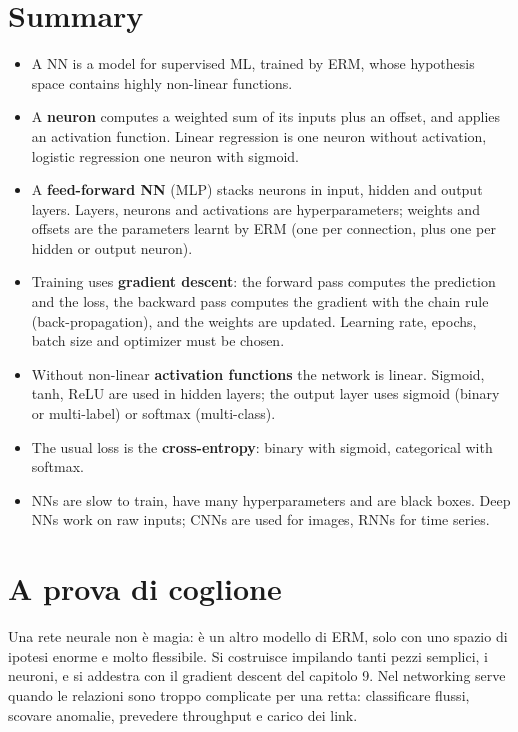 \section{Summary}
\begin{itemize}
    \item A NN is a model for supervised ML, trained by ERM, whose hypothesis space contains highly non-linear functions.
    \item A \textbf{neuron} computes a weighted sum of its inputs plus an offset, and applies an activation function. Linear regression is one neuron without activation, logistic regression one neuron with sigmoid.
    \item A \textbf{feed-forward NN} (MLP) stacks neurons in input, hidden and output layers. Layers, neurons and activations are hyperparameters; weights and offsets are the parameters learnt by ERM (one per connection, plus one per hidden or output neuron).
    \item Training uses \textbf{gradient descent}: the forward pass computes the prediction and the loss, the backward pass computes the gradient with the chain rule (back-propagation), and the weights are updated. Learning rate, epochs, batch size and optimizer must be chosen.
    \item Without non-linear \textbf{activation functions} the network is linear. Sigmoid, tanh, ReLU are used in hidden layers; the output layer uses sigmoid (binary or multi-label) or softmax (multi-class).
    \item The usual loss is the \textbf{cross-entropy}: binary with sigmoid, categorical with softmax.
    \item NNs are slow to train, have many hyperparameters and are black boxes. Deep NNs work on raw inputs; CNNs are used for images, RNNs for time series.
\end{itemize}



\section{A prova di coglione}
Una rete neurale non è magia: è un altro modello di ERM, solo con uno spazio di ipotesi enorme e molto flessibile. Si costruisce impilando tanti pezzi semplici, i neuroni, e si addestra con il gradient descent del capitolo 9. Nel networking serve quando le relazioni sono troppo complicate per una retta: classificare flussi, scovare anomalie, prevedere throughput e carico dei link.

